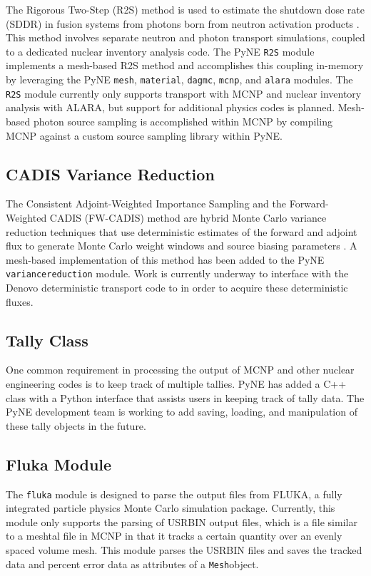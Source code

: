 \documentclass{anstrans}
\newcommand{\Mesh}{\texttt{Mesh}}
\begin{document}
The Rigorous Two-Step (R2S) method is used to estimate the shutdown dose rate
(SDDR) in fusion systems from photons born from neutron activation products
\cite{chen_rigorous_2002}. This method involves separate neutron and photon
transport simulations, coupled to a dedicated nuclear inventory analysis code.
The PyNE \texttt{R2S} module implements a mesh-based R2S method and
accomplishes this coupling in-memory by leveraging the PyNE \texttt{mesh},
\texttt{material}, \texttt{dagmc}, \texttt{mcnp}, and \texttt{alara} modules.
The \texttt{R2S} module currently only supports transport with MCNP and nuclear
inventory analysis with ALARA, but support for additional physics codes is
planned. Mesh-based photon source sampling is accomplished within MCNP by
compiling MCNP against a custom source sampling library within PyNE.


\subsection{CADIS Variance Reduction}

The Consistent Adjoint-Weighted Importance Sampling and the
Forward-Weighted CADIS (FW-CADIS) method are hybrid Monte Carlo variance reduction
techniques that use deterministic estimates of the forward and adjoint flux to
generate Monte Carlo weight windows and source biasing parameters
\cite{haghighat_monte_2003}. A mesh-based implementation of this method has
been added to the PyNE \texttt{variancereduction} module. Work is currently
underway to interface with the Denovo \cite{Evans2010} deterministic transport
code to in order to acquire these deterministic fluxes.


\subsection{Tally Class}

One common requirement in processing the output of MCNP and other nuclear
engineering codes is to keep track of multiple tallies. PyNE has added a
C++ class with a Python interface that assists users in keeping track of
tally data. The PyNE development team is working to add saving, loading,
and manipulation of these tally objects in the future.

\subsection{Fluka Module}

The \texttt{fluka} module is designed to parse the output files from FLUKA, a fully 
integrated particle physics Monte Carlo simulation package\cite{fluka07}. Currently, 
this module only supports the parsing of USRBIN output files, which is 
a file similar to a meshtal file in MCNP in that it tracks a certain 
quantity over an evenly spaced volume mesh. This module parses the USRBIN 
files and saves the tracked data and percent error data as attributes of 
a \Mesh object.
\end{document}
